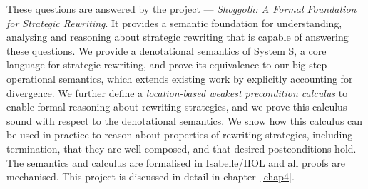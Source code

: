 These questions are answered by the project --- \emph{Shoggoth: A Formal Foundation for Strategic Rewriting}. It provides a semantic foundation for understanding, analysing and reasoning about strategic rewriting that is capable of answering these questions.
We provide a denotational semantics of System S, a core language for strategic rewriting, and prove its equivalence to our big-step operational semantics, which extends existing work by explicitly accounting for divergence.
We further define a \emph{location-based weakest precondition calculus} to enable formal reasoning about rewriting strategies, and we prove this calculus sound with respect to the denotational semantics.
We show how this calculus can be used in practice to reason about properties of rewriting strategies, including termination, that they are well-composed, and that desired postconditions hold.
The semantics and calculus are formalised in Isabelle/HOL and all proofs are mechanised. This project is discussed in detail in chapter~\ref{chap4}.

